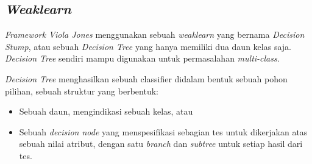 \subsection{\emph{Weaklearn}}

\emph{Framework Viola Jones} menggunakan sebuah \emph{weaklearn} yang bernama 
\emph{Decision Stump}, atau sebuah \emph{Decision Tree} yang hanya memiliki 
dua daun kelas saja. \emph{Decision Tree} sendiri mampu digunakan untuk 
permasalahan \emph{multi-class}.

\emph{Decision Tree} menghasilkan sebuah classifier didalam bentuk sebuah pohon 
pilihan, sebuah struktur yang berbentuk:
\begin{itemize}
  \item Sebuah daun, mengindikasi sebuah kelas, atau
  \item Sebuah \emph{decision node} yang menspesifikasi 
  sebagian tes untuk dikerjakan atas sebuah nilai 
  atribut, dengan satu \emph{branch} dan \emph{subtree} untuk 
  setiap hasil dari tes.
\end{itemize}

